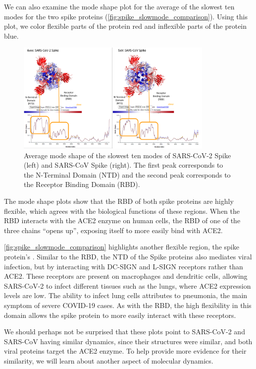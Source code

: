 We can also examine the mode shape plot for the average of the slowest ten modes for the two spike proteins (\autoref{fig:spike_slowmode_comparison}). Using this plot, we color flexible parts of the protein red and inflexible parts of the protein blue.\\

\begin{figure}[h]
	\centering
	\mySfFamily
	\includegraphics[width = 0.85\textwidth]{../images/spike_slowmode_comparison.png}
	\caption{Average mode shape of the slowest ten modes of SARS-CoV-2 Spike (left) and SARS-CoV Spike (right). The first peak corresponds to the N-Terminal Domain (NTD) and the second peak corresponds to the Receptor Binding Domain (RBD).}
	\label{fig:spike_slowmode_comparison}
\end{figure}

The mode shape plots show that the RBD of both spike proteins are highly flexible, which agrees with the biological functions of these regions. When the RBD interacts with the ACE2 enzyme on human cells, the RBD of one of the three chains ``opens up'', exposing itself to more easily bind with ACE2.

\autoref{fig:spike_slowmode_comparison} highlights another flexible region, the spike protein's . Similar to the RBD, the NTD of the Spike proteins also mediates viral infection, but by interacting with DC-SIGN and L-SIGN receptors rather than ACE2. These receptors are present on macrophages and dendritic cells, allowing SARS-CoV-2 to infect different tissues such as the lungs, where ACE2 expression levels are low. The ability to infect lung cells attributes to pneumonia, the main symptom of severe COVID-19 cases. As with the RBD, the high flexibility in this domain allows the spike protein to more easily interact with these receptors.

We should perhaps not be surprised that these plots point to SARS-CoV-2 and SARS-CoV having similar dynamics, since their structures were similar, and both viral proteins target the ACE2 enzyme. To help provide more evidence for their similarity, we will learn about another aspect of molecular dynamics.

